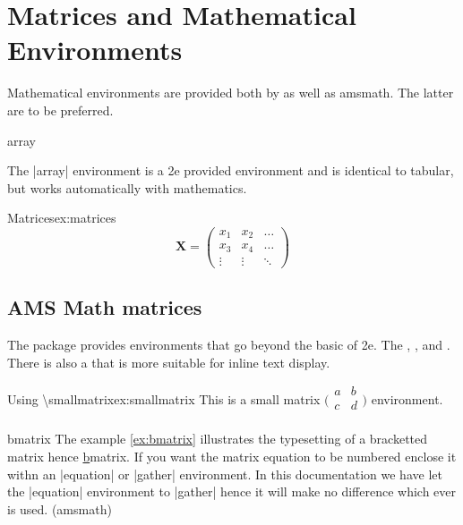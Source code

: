 \chapter{Matrices and Mathematical Environments}
\label{matrices}

Mathematical environments are provided both by \latexe as well as amsmath. The latter are to be preferred.


\begin{docEnvironment}{array}{}
\end{docEnvironment}
The |array| environment is a \latex2e provided environment and is identical to tabular, but works automatically with mathematics. 


\begin{texexample}{Matrices}{ex:matrices}
\[
\mathbf{X} = \left(
\begin{array}{ccc}
x_1 & x_2 & \ldots \\
x_3 & x_4 & \ldots \\
\vdots & \vdots & \ddots
\end{array} \right)
\]
\end{texexample}

\section{AMS Math matrices}

The  package provides environments that go beyond the basic  of \latex2e. The , ,  and . 
There is also a  that is more suitable for inline text display. 

\begin{texexample}{Using \textbackslash smallmatrix}{ex:smallmatrix}
This is a small matrix $\bigl(\begin{smallmatrix}
a&b\\
c&d\\
\end{smallmatrix}\bigr)$ environment. \lorem
\end{texexample}


\begin{docEnvironment}{bmatrix}{}
The example \ref{ex:bmatrix} illustrates the typesetting of a bracketted matrix hence \ul{b}matrix. If you want the matrix equation to be numbered enclose it withn an |equation| or |gather| environment. In this documentation we have let the |equation| environment to |gather| hence it will make no difference which ever is used. (amsmath)
\end{docEnvironment}

